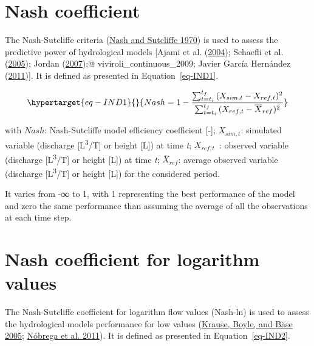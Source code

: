 \documentclass[
  letterpaper,
  DIV=11,
  numbers=noendperiod]{scrreprt}
\begin{document}
\hypertarget{sec-tech_performance_indicators_nash}{%
\chapter{Nash coefficient}\label{sec-tech_performance_indicators_nash}}

The Nash-Sutcliffe criteria
(\protect\hyperlink{ref-nash_river_1970}{Nash and Sutcliffe 1970}) is
used to assess the predictive power of hydrological models {[}Ajami et
al. (\protect\hyperlink{ref-ajami_calibration_2004}{2004}); Schaefli et
al. (\protect\hyperlink{ref-schaefli_conceptual_2005}{2005}); Jordan
(\protect\hyperlink{ref-jordan_modeprevision_2007}{2007});@
viviroli\_continuous\_2009; Javier García Hernández
(\protect\hyperlink{ref-garcia_hernandez_flood_2011}{2011}){]}. It is
defined as presented in Equation~\ref{eq-IND1}.

\begin{equation}\protect\hypertarget{eq-IND1}{}{
Nash = 1 - \frac{\sum_{t = t_{i}}^{t_{f}}{(X_{sim,t} - X_{ref,t})^{2}}}{\sum_{t = t_{i}}^{t_{f}}{(X_{ref,t} - {\overline{X}_{ref}})^{2}}}
}\label{eq-IND1}\end{equation}

with \(Nash\): Nash-Sutcliffe model efficiency coefficient {[}-{]};
\(X_{sim,t}\): simulated variable (discharge
{[}L\textsuperscript{3}/T{]} or height {[}L{]}) at time \emph{t};
\(X_{ref,t}\)~: observed variable (discharge
{[}L\textsuperscript{3}/T{]} or height {[}L{]}) at time \emph{t};
\(\overline{X}_{ref}\): average observed variable (discharge
{[}L\textsuperscript{3}/T{]} or height {[}L{]}) for the considered
period.

It varies from -∞ to 1, with 1 representing the best performance of the
model and zero the same performance than assuming the average of all the
observations at each time step.

\hypertarget{sec-tech_performance_indicators_nashlog}{%
\chapter{Nash coefficient for logarithm
values}\label{sec-tech_performance_indicators_nashlog}}

The Nash-Sutcliffe coefficient for logarithm flow values (Nash-ln) is
used to assess the hydrological models performance for low values
(\protect\hyperlink{ref-krause_comparison_2005}{Krause, Boyle, and Bäse
2005}; \protect\hyperlink{ref-nobrega_uncertainty_2011}{Nóbrega et al.
2011}). It is defined as presented in Equation~\ref{eq-IND2}.
\end{document}
